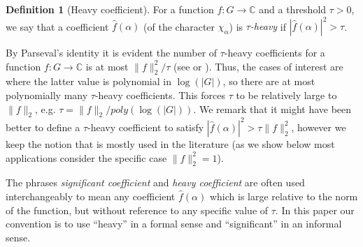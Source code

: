 \documentclass[11pt]{article}
\theoremstyle{definition}
\newtheorem{definition}[theorem]{Definition}
\newcommand{\N}{\mathbb{N}}
\newcommand{\Z}{\mathbb{Z}}
\newcommand{\C}{\mathbb{C}}
\begin{document}

\begin{definition} [Heavy coefficient]
    For a function $f:G \rightarrow \C$ and a threshold $\tau>0$, we say that a coefficient $\widehat{f}(\alpha)$ (of the character $\chi_\alpha$) is \emph{$\tau$-heavy} if $|\widehat{f}(\alpha)|^2>\tau$.
\end{definition}

By Parseval's identity it is evident the number of $\tau$-heavy coefficients for a function $f:G \rightarrow \C$ is at most $\| f \|_2^2 / \tau$ (see \cite[Lemma 3.4]{KM} or \cite[Lemma 4.8]{Mansour94}). Thus, the cases of interest are where the latter value is polynomial in $\log(|G|)$, so there are at most polynomially many $\tau$-heavy coefficients. This forces $\tau$ to be relatively large to $\| f \|_2$, e.g. $\tau = \| f \|_2/ poly(\log(|G|))$. We remark that it might have been better to define a $\tau$-heavy coefficient to satisfy $|\widehat{f}(\alpha)|^2>\tau \| f \|_2^2$, however we keep the notion that is mostly used in the literature (as we show below most applications consider the specific case $\| f \|_2^2 = 1$).

The phrases \emph{significant coefficient} and \emph{heavy coefficient} are often used interchangeably to mean any coefficient $\widehat{f}(\alpha)$ which is large relative to the norm of the function, but without reference to any specific value of $\tau$.
In this paper our convention is to use ``heavy'' in a formal sense and ``significant'' in an informal sense.
\end{document}
